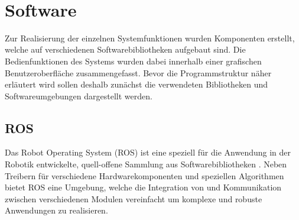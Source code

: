\\


\red[Transformationen:\\
Map = World\\
World -> BaseLink -> CameraLink -> Camera\\
Camera -> Projector\\
Projector -> IntrinsicProj\\
World -> Objects\\
World -> ARMarker (eq. to Objects)\\
]

\section{Software}
Zur Realisierung der einzelnen Systemfunktionen wurden Komponenten erstellt, welche auf verschiedenen Softwarebibliotheken aufgebaut sind. Die Bedienfunktionen des Systems wurden dabei innerhalb einer grafischen Benutzeroberfläche zusammengefasst. Bevor die Programmstruktur näher erläutert wird sollen deshalb zunächst die verwendeten Bibliotheken und Softwareumgebungen dargestellt werden.

\subsection{ROS}
\label{chap:ros}
Das Robot Operating System (ROS) ist eine speziell für die Anwendung in der Robotik entwickelte, quell-offene Sammlung aus Softwarebibliotheken \cite{ROS}. Neben Treibern für verschiedene Hardwarekomponenten und speziellen Algorithmen bietet ROS eine Umgebung, welche die Integration von und Kommunikation zwischen verschiedenen Modulen vereinfacht um komplexe und robuste Anwendungen zu realisieren. 

